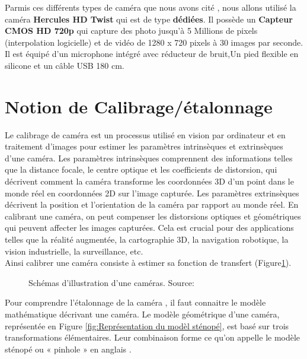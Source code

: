  Parmis ces différents types de caméra que nous avons cité , nous allons utilisé la caméra \textbf{Hercules HD Twist} qui est de type \textbf{dédiées}. Il possède un \textbf{Capteur CMOS HD 720p} qui capture des photo jusqu’à 5 Millions de pixels (interpolation logicielle) et de vidéo de 1280 x 720 pixels à 30 images par seconde. Il est équipé d'un microphone intégré avec réducteur de bruit,Un pied flexible en silicone et un câble USB 180 cm.
 \newpage
 
 
 \section{Notion de  Calibrage/étalonnage}\label{sec:Notion de  Calibrage/étalonnage}
 
 Le calibrage de caméra est un processus utilisé en vision par ordinateur et en traitement d'images pour estimer les paramètres intrinsèques et extrinsèques d'une caméra. Les paramètres intrinsèques comprennent des informations telles que la distance focale, le centre optique et les coefficients de distorsion, qui décrivent comment la caméra transforme les coordonnées 3D d'un point dans le monde réel en coordonnées 2D sur l'image capturée. Les paramètres extrinsèques décrivent la position et l'orientation de la caméra par rapport au monde réel.
 En calibrant une caméra, on peut compenser les distorsions optiques et géométriques qui peuvent affecter les images capturées. Cela est crucial pour des applications telles que la réalité augmentée, la cartographie 3D, la navigation robotique, la vision industrielle, la surveillance, etc.\\
 Ainsi calibrer une caméra consiste à estimer sa fonction de transfert \cite{orteu_calibrage_nodate} (Figure\ref{fig:Illustration caméras}).
 
 \begin{figure}[H]%
 	\center%
 	\setlength{\fboxsep}{5pt}%
 	\setlength{\fboxrule}{0.5pt}%
   \caption[Illustration d'une caméras]{Schémas d'illustration d'une caméras. Source: \cite{orteu_calibrage_nodate}}
   \label{fig:Illustration caméras}
 \end{figure}
 
 Pour comprendre l'étalonnage de la caméra , il faut connaitre le modèle mathématique décrivant une caméra.
 Le modèle géométrique d’une caméra, représentée en Figure \ref{fig:Représentation du modèl sténopé}, est basé sur trois transformations élémentaires. Leur combinaison forme ce qu’on appelle le modèle sténopé ou « pinhole » en anglais \cite{eikosim_etalonnage_2021}.
 

